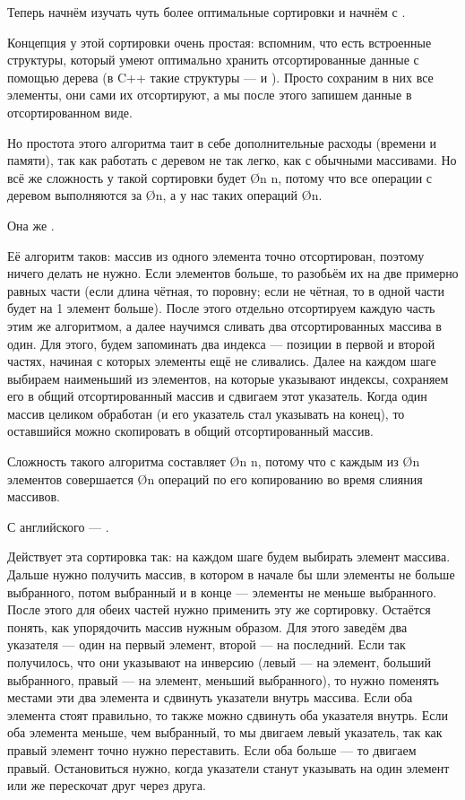 Теперь начнём изучать чуть более оптимальные сортировки и начнём с .

Концепция у этой сортировки очень простая: вспомним, что есть встроенные структуры, который умеют оптимально хранить отсортированные данные с помощью дерева (в C++ такие структуры —  и ). Просто сохраним в них все элементы, они сами их отсортируют, а мы после этого запишем данные в отсортированном виде.

Но простота этого алгоритма таит в себе дополнительные расходы (времени и памяти), так как работать с деревом не так легко, как с обычными массивами. Но всё же сложность у такой сортировки будет \O{n \log n}, потому что все операции с деревом выполняются за \O{\log n}, а у нас таких операций \O{n}.

Она же .

Её алгоритм таков: массив из одного элемента точно отсортирован, поэтому ничего делать не нужно. Если элементов больше, то разобьём их на две примерно равных части (если длина чётная, то поровну; если не чётная, то в одной части будет на 1 элемент больше). После этого отдельно отсортируем каждую часть этим же алгоритмом, а далее научимся сливать два отсортированных массива в один. Для этого, будем запоминать два индекса — позиции в первой и второй частях, начиная с которых элементы ещё не сливались. Далее на каждом шаге выбираем наименьший из элементов, на которые указывают индексы, сохраняем его в общий отсортированный массив и сдвигаем этот указатель. Когда один массив целиком обработан (и его указатель стал указывать на конец), то оставшийся можно скопировать в общий отсортированный массив.

Сложность такого алгоритма составляет \O{n \log n}, потому что с каждым из \O{n} элементов совершается \O{\log n} операций по его копированию во время слияния массивов.

С английского — .

Действует эта сортировка так: на каждом шаге будем выбирать элемент массива. Дальше нужно получить массив, в котором в начале бы шли элементы не больше выбранного, потом выбранный и в конце — элементы не меньше выбранного. После этого для обеих частей нужно применить эту же сортировку. Остаётся понять, как упорядочить массив нужным образом. Для этого заведём два указателя — один на первый элемент, второй — на последний. Если так получилось, что они указывают на инверсию (левый — на элемент, больший выбранного, правый — на элемент, меньший выбранного), то нужно поменять местами эти два элемента и сдвинуть указатели внутрь массива. Если оба элемента стоят правильно, то также можно сдвинуть оба указателя внутрь. Если оба элемента меньше, чем выбранный, то мы двигаем левый указатель, так как правый элемент точно нужно переставить. Если оба больше — то двигаем правый. Остановиться нужно, когда указатели станут указывать на один элемент или же перескочат друг через друга.

